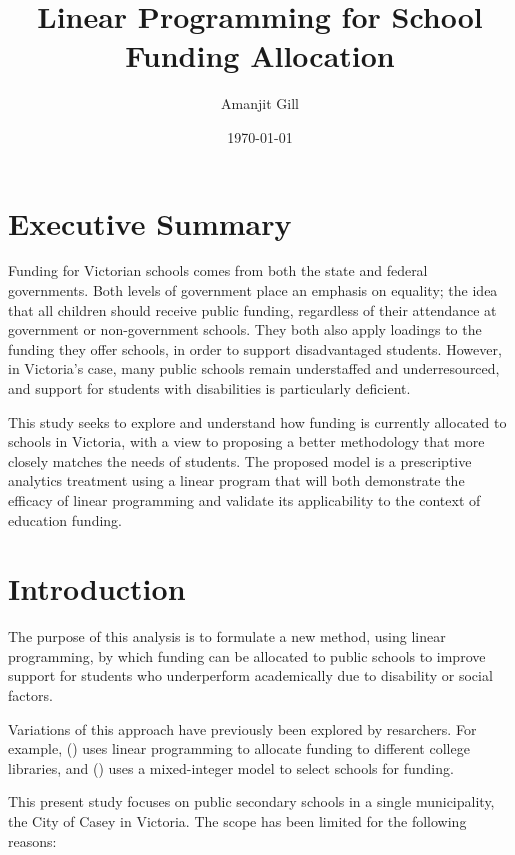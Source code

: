 \documentclass[11pt, a4paper]{article}
\title{\LARGE\bfseries Linear Programming for School Funding Allocation}
\author{\Large Amanjit Gill}
\date{\normalsize \today}
\begin{document}
    
    \maketitle

    \section{Executive Summary}

    Funding for Victorian schools comes from both the state and federal governments. Both levels of government place an emphasis on equality; the idea that all children should receive public funding, regardless of their attendance at government or non-government schools. They both also apply loadings to the funding they offer schools, in order to support disadvantaged students. However, in Victoria's case, many public schools remain understaffed and underresourced, and support for students with disabilities is particularly deficient. 

    This study seeks to explore and understand how funding is currently allocated to schools in Victoria, with a view to proposing a better methodology that more closely matches the needs of students. The proposed model is a prescriptive analytics treatment using a linear program that will both demonstrate the efficacy of linear programming and validate its applicability to the context of education funding.

    \section{Introduction} \label{intro}

    The purpose of this analysis is to formulate a new method, using linear programming, by which funding can be allocated to public schools to improve support for students who underperform academically due to disability or social factors.

    Variations of this approach have previously been explored by resarchers. For example,  () uses linear programming to allocate funding to different college libraries, and  () uses a mixed-integer model to select schools for funding. 
    
    This present study focuses on public secondary schools in a single municipality, the City of Casey in Victoria. The scope has been limited for the following reasons:
\end{document}
